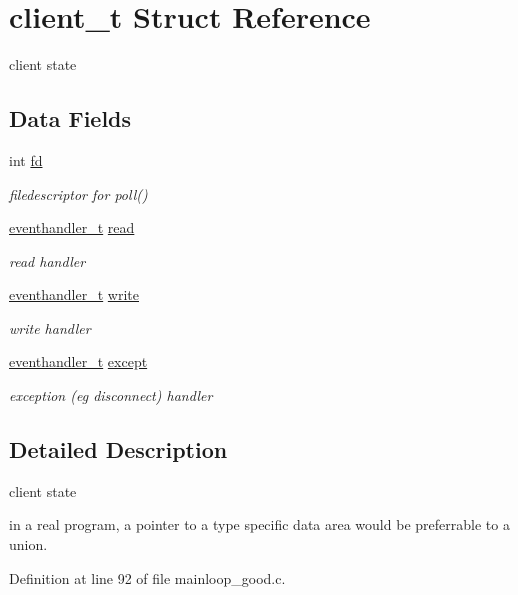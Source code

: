 \hypertarget{structclient__t}{
\section{client\_\-t Struct Reference}
\label{structclient__t}
}
client state  


\subsection*{Data Fields}
\begin{CompactItemize}
\item 
int \hyperlink{structclient__t_o0}{fd}
\begin{CompactList}\small\item\em filedescriptor for poll() \item\end{CompactList}\item 
\hyperlink{mainloop__good_8c_a20}{eventhandler\_\-t} \hyperlink{structclient__t_o1}{read}
\begin{CompactList}\small\item\em read handler \item\end{CompactList}\item 
\hyperlink{mainloop__good_8c_a20}{eventhandler\_\-t} \hyperlink{structclient__t_o2}{write}
\begin{CompactList}\small\item\em write handler \item\end{CompactList}\item 
\hyperlink{mainloop__good_8c_a20}{eventhandler\_\-t} \hyperlink{structclient__t_o3}{except}
\begin{CompactList}\small\item\em exception (eg disconnect) handler \item\end{CompactList}\end{CompactItemize}


\subsection{Detailed Description}
client state 

in a real program, a pointer to a type specific data area would be preferrable to a union. 



Definition at line 92 of file mainloop\_\-good.c.

